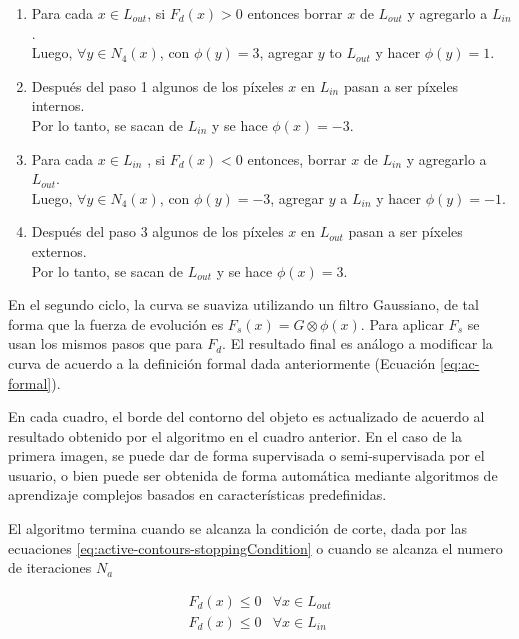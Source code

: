 \begin{enumerate}

    \item Para cada $x \in L_{out}$, si $F_{d}(x) > 0$ entonces borrar $x$ de $L_{out}$ y agregarlo a $L_{in}$. \\
    Luego, $\forall y \in N_{4}(x)$, con $\phi(y) = 3$, agregar $y$ to $L_{out}$ y hacer $\phi(y) = 1$.

    \item Después del paso 1 algunos de los píxeles $x$ en $L_{in}$ pasan a ser píxeles internos. \\
    Por lo tanto, se sacan de $L_{in}$ y se hace $\phi(x) = -3$.

    \item Para cada $x \in L_{in}$ , si $F_{d}(x) < 0$ entonces, borrar $x$ de $L_{in}$ y agregarlo a $L_{out}$. \\
    Luego, $\forall y \in N_{4}(x)$, con $\phi(y) = -3$, agregar $y$ a $L_{in}$ y hacer $\phi(y) = -1$.


    \item Después del paso 3 algunos de los píxeles $x$ en $L_{out}$ pasan a ser píxeles externos. \\
    Por lo tanto, se sacan de $L_{out}$ y se hace $\phi(x) = 3$.

\end{enumerate}

En el segundo ciclo, la curva se suaviza utilizando un filtro Gaussiano, de tal
forma que la fuerza de evolución es $F_{s}(x) = G \otimes \phi(x)$. Para
aplicar $F_s$ se usan los mismos pasos que para $F_d$. El resultado final es
análogo a modificar la curva de acuerdo a la definición formal dada
anteriormente (Ecuación \ref{eq:ac-formal}).

En cada cuadro, el borde del contorno del objeto es actualizado de acuerdo al
resultado obtenido por el algoritmo en el cuadro anterior. En el caso de la
primera imagen, se puede dar de forma supervisada o semi-supervisada por el
usuario, o bien puede ser obtenida de forma automática mediante algoritmos de
aprendizaje complejos basados en características predefinidas.

El algoritmo termina cuando se alcanza la condición de corte, dada por las
ecuaciones \ref{eq:active-contours-stoppingCondition} o cuando se alcanza el
numero de iteraciones $N_a$

\begin{equation}
\label{eq:active-contours-stoppingCondition}
    \begin{array}{ll}
        F_{d}(x) \leq 0 & \forall x \in L_{out}\\
        F_{d}(x) \leq 0 & \forall x \in L_{in}
    \end{array}
\end{equation}

